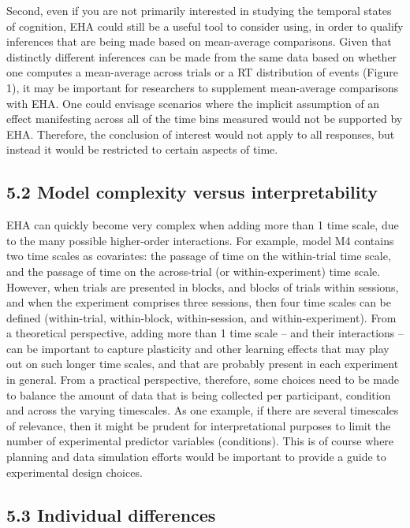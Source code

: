 \documentclass[
  man, donotrepeattitle,floatsintext]{apa6}
\begin{document}
Second, even if you are not primarily interested in studying the temporal states of cognition, EHA could still be a useful tool to consider using, in order to qualify inferences that are being made based on mean-average comparisons. Given that distinctly different inferences can be made from the same data based on whether one computes a mean-average across trials or a RT distribution of events (Figure 1), it may be important for researchers to supplement mean-average comparisons with EHA. One could envisage scenarios where the implicit assumption of an effect manifesting across all of the time bins measured would not be supported by EHA. Therefore, the conclusion of interest would not apply to all responses, but instead it would be restricted to certain aspects of time.

\subsection{5.2 Model complexity versus interpretability}\label{model-complexity-versus-interpretability}

EHA can quickly become very complex when adding more than 1 time scale, due to the many possible higher-order interactions.
For example, model M4 contains two time scales as covariates: the passage of time on the within-trial time scale, and the passage of time on the across-trial (or within-experiment) time scale. However, when trials are presented in blocks, and blocks of trials within sessions, and when the experiment comprises three sessions, then four time scales can be defined (within-trial, within-block, within-session, and within-experiment).
From a theoretical perspective, adding more than 1 time scale -- and their interactions -- can be important to capture plasticity and other learning effects that may play out on such longer time scales, and that are probably present in each experiment in general.
From a practical perspective, therefore, some choices need to be made to balance the amount of data that is being collected per participant, condition and across the varying timescales. As one example, if there are several timescales of relevance, then it might be prudent for interpretational purposes to limit the number of experimental predictor variables (conditions).
This is of course where planning and data simulation efforts would be important to provide a guide to experimental design choices.

\subsection{5.3 Individual differences}\label{individual-differences}
\end{document}

